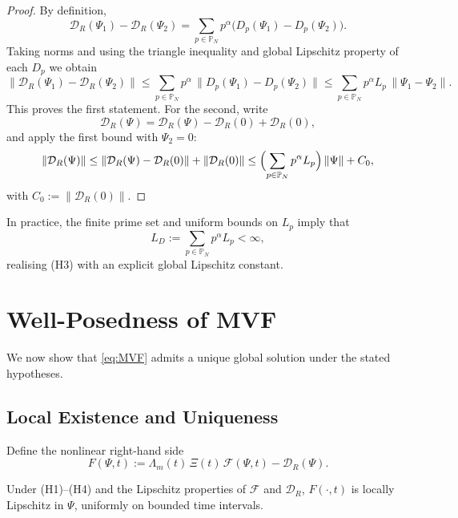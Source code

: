 \documentclass[11pt]{article}
\begin{document}
\begin{proof}
By definition,
\[
  \mathcal{D}_R(\Psi_1) - \mathcal{D}_R(\Psi_2)
  =
  \sum_{p\in\mathbb{P}_N} p^\alpha \bigl(D_p(\Psi_1)-D_p(\Psi_2)\bigr).
\]
Taking norms and using the triangle inequality and global Lipschitz property of each $D_p$ we obtain
\[
  \|\mathcal{D}_R(\Psi_1) - \mathcal{D}_R(\Psi_2)\|
  \le
  \sum_{p\in\mathbb{P}_N} p^\alpha\,\|D_p(\Psi_1)-D_p(\Psi_2)\|
  \le
  \sum_{p\in\mathbb{P}_N} p^\alpha L_p\,\|\Psi_1-\Psi_2\|.
\]
This proves the first statement. For the second, write
\[
  \mathcal{D}_R(\Psi)
  =
  \mathcal{D}_R(\Psi) - \mathcal{D}_R(0) + \mathcal{D}_R(0),
\]
and apply the first bound with $\Psi_2=0$:
\[
  \|\mathcal{D}_R(\Psi)\|
  \le
  \|\mathcal{D}_R(\Psi) - \mathcal{D}_R(0)\| + \|\mathcal{D}_R(0)\|
  \le
  \Bigl(\sum_{p\in\mathbb{P}_N}p^\alpha L_p\Bigr)\,\|\Psi\| + C_0,
\]
with $C_0 := \|\mathcal{D}_R(0)\|$. 
\end{proof}

In practice, the finite prime set and uniform bounds on $L_p$ imply that
\[
  L_D := \sum_{p\in\mathbb{P}_N}p^\alpha L_p < \infty,
\]
realising (H3) with an explicit global Lipschitz constant.

\section{Well-Posedness of MVF}

We now show that \eqref{eq:MVF} admits a unique global solution under the stated hypotheses.

\subsection{Local Existence and Uniqueness}

Define the nonlinear right-hand side
\[
  F(\Psi,t)
  :=
  \Lambda_m(t)\,\Xi(t)\,\mathcal{F}(\Psi,t) - \mathcal{D}_R(\Psi).
\]

\begin{lemma}
Under (H1)--(H4) and the Lipschitz properties of $\mathcal{F}$ and $\mathcal{D}_R$, $F(\cdot,t)$ is locally Lipschitz in $\Psi$, uniformly on bounded time intervals.
\end{lemma}
\end{document}
